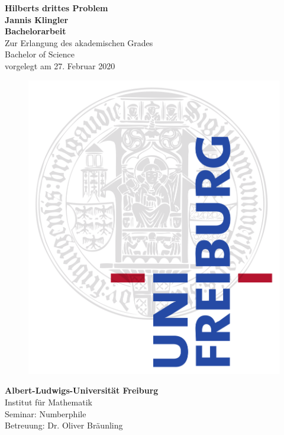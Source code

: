 \documentclass[11pt,titlepage]{article}
\theoremstyle{definition}
\theoremstyle{remark}
\begin{document}
	\setlength{\parindent}{0em}
	\onehalfspacing
	\begin{titlepage}
		\begin{center}
			\huge\textbf{Hilberts drittes Problem}\\
			\vspace{1.2cm}
			\LARGE\textbf{{Jannis Klingler}}\\
			\vspace{0.5cm}
			\LARGE\textbf{{Bachelorarbeit}}\\
			\vspace{0.5cm}
			\normalsize
			Zur Erlangung des akademischen Grades\\
			Bachelor of Science\\
			\vspace{0.3cm}
			vorgelegt am 27. Februar 2020 \\
			\vspace{0.7cm}
			
			\begin{figure}[h!]
				\centering
				\includegraphics[scale=0.07]{UniFreiburgLogo.png}
			\end{figure}
			
			\vspace{0.7cm}
			\large \textbf{Albert-Ludwigs-Universität Freiburg}\\
			\vspace{0.2cm}
			\large {Institut für Mathematik}\\
			\vspace{1cm}
			\large {Seminar: Numberphile}\\
			\large {Betreuung: Dr. Oliver Bräunling}\\
			\vspace{1.8cm}
		\end{center}
	\end{titlepage}
	
\end{document}
